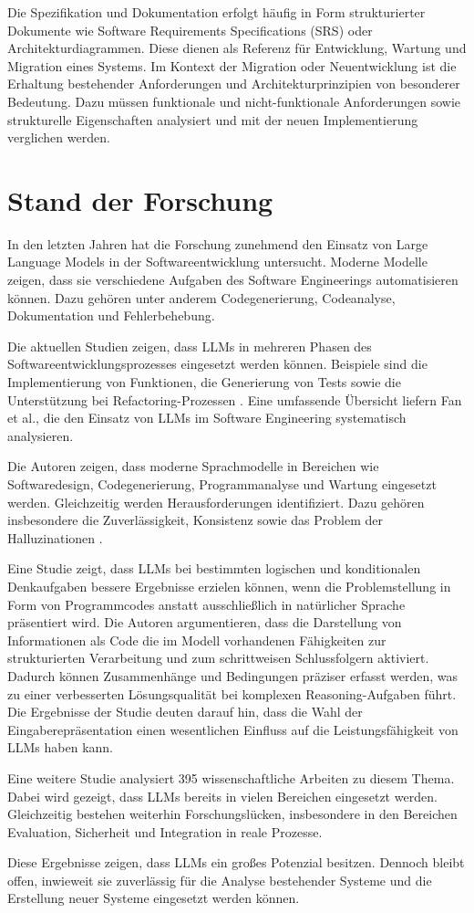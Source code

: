 Die Spezifikation und Dokumentation erfolgt häufig in
Form strukturierter Dokumente wie Software
Requirements Specifications (SRS) oder
Architekturdiagrammen. Diese dienen als Referenz für Entwicklung, Wartung und
Migration eines Systems. Im Kontext der Migration oder Neuentwicklung ist die
Erhaltung bestehender Anforderungen und
Architekturprinzipien von besonderer Bedeutung.
Dazu müssen funktionale und nicht-funktionale
Anforderungen sowie strukturelle Eigenschaften
analysiert und mit der neuen Implementierung
verglichen werden.

\section{Stand der Forschung}

In den letzten Jahren hat die Forschung zunehmend den
Einsatz von Large Language Models in der
Softwareentwicklung untersucht. Moderne Modelle zeigen, dass sie verschiedene Aufgaben
des Software Engineerings automatisieren können. Dazu gehören unter anderem Codegenerierung,
Codeanalyse, Dokumentation und Fehlerbehebung.

Die aktuellen Studien zeigen, dass LLMs in mehreren Phasen
des Softwareentwicklungsprozesses eingesetzt werden
können. Beispiele sind die Implementierung von Funktionen, die
Generierung von Tests sowie die Unterstützung bei
Refactoring-Prozessen \cite{LLM4SE}. Eine umfassende Übersicht liefern Fan et al., die den
Einsatz von LLMs im Software Engineering systematisch
analysieren.

Die Autoren zeigen, dass moderne Sprachmodelle in
Bereichen wie Softwaredesign, Codegenerierung,
Programmanalyse und Wartung eingesetzt werden.
Gleichzeitig werden Herausforderungen identifiziert.
Dazu gehören insbesondere die Zuverlässigkeit,
Konsistenz sowie das Problem der Halluzinationen
\cite{LLM4SE2}.

Eine Studie \cite{puerto-etal-2024-code} zeigt, dass LLMs bei bestimmten logischen und konditionalen Denkaufgaben
bessere Ergebnisse erzielen können, wenn die Problemstellung
in Form von Programmcodes anstatt ausschließlich in natürlicher
Sprache präsentiert wird. Die Autoren argumentieren, dass die
Darstellung von Informationen als Code die im Modell vorhandenen
Fähigkeiten zur strukturierten Verarbeitung und zum schrittweisen
Schlussfolgern aktiviert. Dadurch können Zusammenhänge und
Bedingungen präziser erfasst werden, was zu einer verbesserten
Lösungsqualität bei komplexen Reasoning-Aufgaben führt.
Die Ergebnisse der Studie deuten darauf hin, dass die Wahl der
Eingaberepräsentation einen wesentlichen Einfluss auf die Leistungsfähigkeit
von LLMs haben kann.


Eine weitere Studie \cite{hou2024largelanguagemodelssoftware} analysiert 395 wissenschaftliche Arbeiten zu diesem Thema. Dabei wird gezeigt, dass LLMs bereits in vielen Bereichen eingesetzt werden. Gleichzeitig bestehen weiterhin Forschungslücken, insbesondere in den Bereichen Evaluation, Sicherheit und Integration in reale Prozesse.

Diese Ergebnisse zeigen, dass LLMs ein
großes Potenzial besitzen. Dennoch bleibt offen, inwieweit sie zuverlässig für
die Analyse bestehender Systeme und die Erstellung
neuer Systeme eingesetzt werden können.